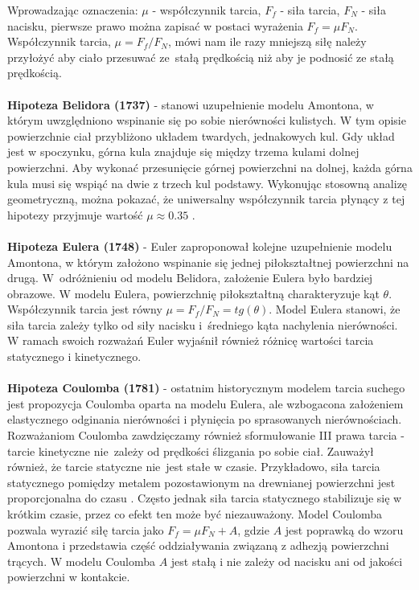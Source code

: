 \documentclass[12pt,a4paper,openright]{report} %
\begin{document}
Wprowadzając oznaczenia: $\mu$ - współczynnik tarcia, $F_f$ - siła tarcia, $F_N$ - siła nacisku, pierwsze prawo można zapisać w postaci wyrażenia $F_f=\mu F_N$. Współczynnik tarcia, $\mu = F_f/F_N$, mówi nam ile razy mniejszą siłę należy przyłożyć aby ciało przesuwać ze~stałą prędkością niż aby je podnosić ze stałą prędkością.\\
\\
\textbf{Hipoteza Belidora (1737)} - stanowi uzupełnienie modelu Amontona, w którym uwzględniono wspinanie się po sobie nierówności kulistych. W tym opisie powierzchnie ciał przybliżono układem twardych, jednakowych kul. Gdy układ jest w spoczynku, górna kula znajduje się między trzema kulami dolnej powierzchni. Aby wykonać przesunięcie górnej powierzchni na dolnej, każda górna kula musi się wspiąć na dwie z trzech kul podstawy. Wykonując stosowną analizę geometryczną, można pokazać, że uniwersalny współczynnik tarcia płynący z tej hipotezy przyjmuje wartość $\mu \approx 0.35$ \cite{Borys}.\\
\\
\textbf{Hipoteza Eulera (1748)} - Euler zaproponował kolejne uzupełnienie modelu Amontona, w którym założono wspinanie się jednej piłokształtnej powierzchni na drugą. W~odróżnieniu od modelu Belidora, założenie Eulera było bardziej obrazowe. W modelu Eulera, powierzchnię piłokształtną charakteryzuje kąt $\theta$. Współczynnik tarcia jest równy $\mu={F_f}/{F_N} = tg(\theta)$. Model Eulera stanowi, że siła tarcia zależy tylko od siły nacisku i~średniego kąta nachylenia nierówności. W ramach swoich rozważań Euler wyjaśnił również różnicę wartości tarcia statycznego i kinetycznego.\\
\\
\textbf{Hipoteza Coulomba (1781)} - ostatnim historycznym modelem tarcia suchego jest propozycja Coulomba oparta na modelu Eulera, ale wzbogacona założeniem elastycznego odginania nierówności i płynięcia po sprasowanych nierównościach. Rozważaniom Coulomba zawdzięczamy również sformułowanie III prawa tarcia - tarcie kinetyczne nie~zależy od prędkości ślizgania po sobie ciał. Zauważył również, że tarcie statyczne nie~jest stałe w czasie. Przykładowo, siła tarcia statycznego pomiędzy metalem pozostawionym na drewnianej powierzchni jest proporcjonalna do czasu \cite{Coulomb, Bartels}. Często jednak siła tarcia statycznego stabilizuje się w krótkim czasie, przez co efekt ten może być niezauważony. Model Coulomba pozwala wyrazić siłę tarcia jako $F_f = \mu F_N +A$, gdzie $A$ jest poprawką do wzoru Amontona i przedstawia część oddziaływania związaną z adhezją powierzchni trących. W modelu Coulomba $A$ jest stałą i nie zależy od nacisku ani od jakości powierzchni w kontakcie.\\
\end{document}
